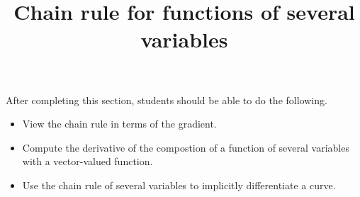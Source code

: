 \documentclass{ximera}
\title{Chain rule for functions of several variables}
\begin{document}
\begin{abstract}
\end{abstract}

\maketitle

\begin{sectionOutcomes}

After completing this section, students should be able to do the following.

\begin{itemize}
\item View the chain rule in terms of the gradient.
\item Compute the derivative of the compostion of a function of
  several variables with a vector-valued function.
\item Use the chain rule of several variables to implicitly
  differentiate a curve.
\end{itemize}

\end{sectionOutcomes}
\end{document}
